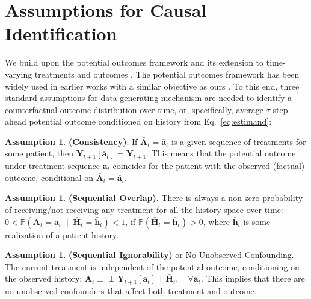 \documentclass{article}
\theoremstyle{plain}
\theoremstyle{definition}
\newtheorem{assumption}[theorem]{Assumption}
\theoremstyle{remark}
\newcommand{\ind}{\perp\!\!\!\!\perp}
\begin{document}
\FloatBarrier



\newpage
\appendix
\onecolumn

\section{Assumptions for Causal Identification} 
\label{app:assumptions}

We build upon the potential outcomes framework \cite{neyman1923application,rubin1978bayesian} and its extension to time-varying treatments and outcomes \cite{robins2009estimation}. The potential outcomes framework has been widely used in earlier works with a similar objective as ours \cite{robins2009estimation, lim2018forecasting, bica2020estimating}. To this end, three standard assumptions for data generating mechanism are needed to identify a counterfactual outcome distribution over time, or, specifically, average $\tau$-step-ahead potential outcome conditioned on history from Eq.~\eqref{eq:estimand}: 
\begin{assumption}
    \label{ass:consistency}
    \textbf{(Consistency)}. If $\bar{\mathbf{A}}_{t} = \bar{\mathbf{a}}_{t}$ is a given sequence of treatments for some patient, then $\mathbf{Y}_{t+1}[\bar{\mathbf{a}}_{t}] = \mathbf{Y}_{t+1}$. This means that the potential outcome under treatment sequence $\bar{\mathbf{a}}_{t}$ coincides for the patient with the observed (factual) outcome, conditional on $\bar{\mathbf{A}}_{t} = \bar{\mathbf{a}}_{t}$.
\end{assumption}
\begin{assumption}
    \label{ass:so}
    \textbf{(Sequential Overlap)}. There is always a non-zero probability of receiving/not receiving any treatment for all the history space over time: $0 < \mathbb{P}(\mathbf{A}_{t} = \mathbf{a}_{t}  \;\mid\;  \bar{\mathbf{H}}_{t} = \bar{\mathbf{h}}_{t}) < 1$, if $\mathbb{P}(\bar{\mathbf{H}}_{t} = \bar{\mathbf{h}}_{t}) > 0$, where $\bar{\mathbf{h}}_{t}$ is some realization of a patient history.
\end{assumption}
\begin{assumption}\label{ass:seq_ignor}
    \label{ass:si}
    \textbf{(Sequential Ignorability)} or No Unobserved Confounding. The current treatment is independent of the potential outcome, conditioning on the observed history: $\mathbf{A}_{t} \ind \mathbf{Y}_{t+1}[\mathbf{a}_t] \,\mid\, \bar{\mathbf{H}}_{t}, \quad \forall \mathbf{a}_t$. This implies that there are no unobserved confounders that affect both treatment and outcome. 
\end{assumption}
\end{document}
